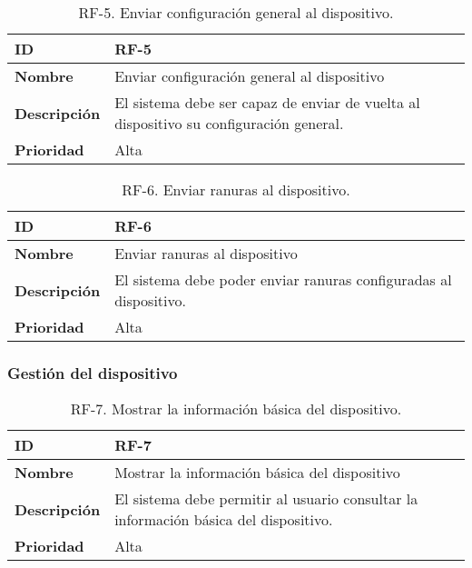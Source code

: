 \begin{table}[h!]
    \centering
    \begin{tabular}{|m{2.5cm}|m{9.27cm}|}
        \hline
        \textbf{ID} & RF-5 \\
        \hline
        \textbf{Nombre} & Enviar configuración general al dispositivo \\
        \hline
        \textbf{Descripción} & El sistema debe ser capaz de enviar de vuelta al dispositivo su configuración general. \\
        \hline
        \textbf{Prioridad} & Alta \\
        \hline
    \end{tabular}
    \caption{RF-5. Enviar configuración general al dispositivo.}
\end{table}

\begin{table}[h!]
    \centering
    \begin{tabular}{|m{2.5cm}|m{9.27cm}|}
        \hline
        \textbf{ID} & RF-6 \\
        \hline
        \textbf{Nombre} & Enviar ranuras al dispositivo \\
        \hline
        \textbf{Descripción} & El sistema debe poder enviar ranuras configuradas al dispositivo. \\
        \hline
        \textbf{Prioridad} & Alta \\
        \hline
    \end{tabular}
    \caption{RF-6. Enviar ranuras al dispositivo.}
\end{table}

\subsubsection{Gestión del dispositivo}

\begin{table}[h!]
    \centering
    \begin{tabular}{|m{2.5cm}|m{9.27cm}|}
        \hline
        \textbf{ID} & RF-7 \\
        \hline
        \textbf{Nombre} & Mostrar la información básica del dispositivo \\
        \hline
        \textbf{Descripción} & El sistema debe permitir al usuario consultar la información básica del dispositivo. \\
        \hline
        \textbf{Prioridad} & Alta \\
        \hline
    \end{tabular}
    \caption{RF-7. Mostrar la información básica del dispositivo.}
\end{table}

